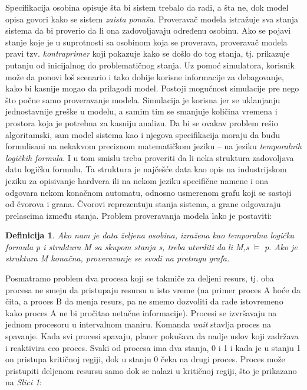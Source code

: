 \documentclass[a4paper]{article}
\newtheorem{definicija}{Definicija}[section]
\begin{document}
Specifikacija osobina opisuje šta bi sistem trebalo da radi, a šta ne, dok model opisa govori kako se sistem \textit{zaista ponaša}. Proveravač modela istražuje sva stanja sistema da bi proverio da li ona zadovoljavaju određenu osobinu. Ako se pojavi stanje koje je u suprotnosti sa osobinom koja se proverava, proveravač modela pravi tzv. \textit{kontraprimer} koji pokazuje kako se došlo do tog stanja, tj. prikazuje putanju od inicijalnog do problematičnog stanja. Uz pomoć simulatora, korisnik može da ponovi loš scenario i tako dobije korisne informacije za debagovanje, kako bi kasnije mogao da prilagodi model. Postoji mogućnost simulacije pre nego što počne samo proveravanje modela. Simulacija je korisna jer se uklanjanju jednostavnije greške u modelu, a samim tim se smanjuje količina vremena i prostora koja je potrebna za kasniju analizu.\cite{principles}
Da bi se ovakav problem rešio algoritamski, sam model sistema kao i njegova specifikacija moraju da budu formulisani na nekakvom preciznom matematičkom jeziku -- na jeziku \textit{temporalnih logičkih formula}. I u tom smislu treba proveriti da li neka struktura zadovoljava datu logičku formulu. Ta struktura je najčešće data kao opis na industrijskom jeziku za opisivanje hardvera ili na nekom jeziku specifične namene i ona odgovara  nekom konačnom automatu, odnosno  usmerenom grafu koji se sastoji od čvorova i grana. Čvorovi reprezentuju stanja sistema, a grane odgovaraju prelascima između stanja. Problem proveravanja modela lako je postaviti:
\begin{definicija}
Ako nam je data željena osobina, izražena kao temporalna logička formula p i struktura M sa skupom stanja s, treba utvrditi da li  M,s $\vDash$ p. Ako je struktura M konačna, proveravanje se svodi na pretragu grafa.
\end{definicija}

Posmatramo problem dva procesa koji se takmiče za deljeni resurs, tj. oba procesa  ne smeju  da pristupaju resursu u isto vreme (na primer proces A hoće da čita, a proces B da menja resurs, pa ne smemo dozvoliti da rade istovremeno kako proces A ne bi pročitao netačne informacije). Procesi se izvršavaju na jednom procesoru u intervalnom maniru.  Komanda \textit{wait} stavlja proces na spavanje. Kada svi procesi spavaju, planer pokušava da nadje uslov koji zadržava i reaktivira ceo proces. Svaki od procesa ima dva stanja, 0 i 1 i kada je u stanju 1 on pristupa kritičnoj regiji, dok u stanju 0 čeka na drugi proces. Proces može pristupiti deljenom resursu samo dok se nalazi u kritičnoj regiji, 
što je prikazano na \textit{Slici 1}:
\end{document}
